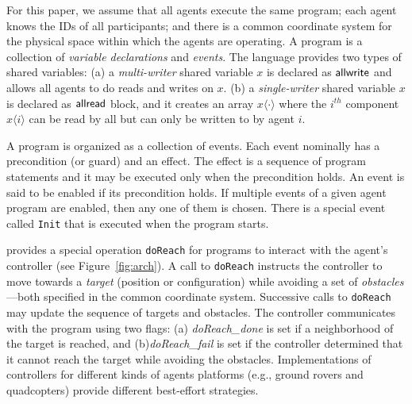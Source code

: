 For this paper, we assume that all agents execute the same \rolang program; each agent knows the IDs of all participants; and there is a common coordinate system for the physical space within which the agents are operating. 
%
A program is a collection of \emph{variable declarations} and \emph{events}. 
The language provides two types of shared variables:
(a) a {\em multi-writer} shared variable $x$ is declared as $\sf{allwrite}$ and allows all agents to do reads and writes on $x$. 
(b) a {\em single-writer\/} shared variable $x$ is declared as $\sf{allread}$ block, and it 
creates an array $x\langle \cdot \rangle$ 
where the $i^{th}$ component $x \langle i \rangle$ can be read by all but can only be written to by agent $i$.

A \rolang program is organized as a collection of events. Each event nominally has a precondition (or guard) and an effect. The effect is a sequence of program statements and it may be executed only when the precondition holds. An event is said to be enabled if its precondition holds. If multiple events of a given agent program are enabled, then any one of them is chosen.  
%
%
%
%
There is a special event called \verb|Init|
that is executed when the program starts. 
 
\rolang provides a special operation \verb|doReach| for programs to interact with the agent's controller (see Figure~\ref{fig:arch}). 
A call to \verb|doReach| instructs the controller to move towards a \emph{target} (position or configuration) while avoiding a set of \emph{obstacles}---both specified in the common coordinate system. Successive calls to \verb|doReach| may update the sequence of targets and obstacles. 
%
The controller communicates with the program using two flags: (a) \emph{doReach_done} is set if a neighborhood of the target is reached, and (b)\emph{doReach_fail} is set if the controller determined that it cannot reach the target while avoiding the obstacles. 
%
%
Implementations of  controllers for different kinds of agents platforms (e.g., ground rovers and quadcopters) provide different  best-effort strategies. 

